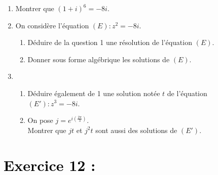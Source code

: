 \documentclass[12pt]{article}
\begin{document}
\begin{enumerate}
    \item Montrer que $(1 + i)^6 = -8i$.

    \item On considère l'équation $(E) : z^2 = -8i$.
    \begin{enumerate}
        \item Déduire de la question 1 une résolution de l'équation $(E)$.
        \item Donner sous forme algébrique les solutions de $(E)$.
    \end{enumerate}

    \item
    \begin{enumerate}
        \item Déduire également de 1 une solution notée $t$ de l'équation $(E') : z^3 = -8i$.
        \item On pose $j = e^{i\left(\frac{2\pi}{3}\right)}$. \\ 
        Montrer que $jt$ et $j^2t$ sont aussi des solutions de $(E')$.
    \end{enumerate}
\end{enumerate}
\section*{\textcolor{black}{Exercice 12 :}}
\end{document}
